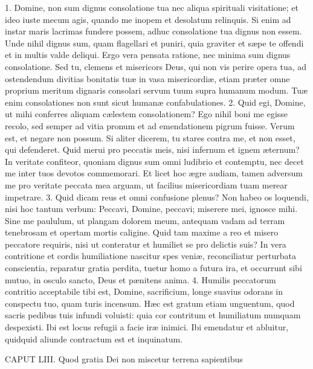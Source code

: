\documentclass[twoside]{article}
\begin{document}
1. Domine, non sum dignus consolatione tua nec aliqua spirituali visitatione; et ideo iuste mecum agis, quando me inopem et desolatum relinquis. Si enim ad instar maris lacrimas fundere possem, adhuc consolatione tua dignus non essem. Unde nihil dignus sum, quam flagellari et puniri, quia graviter et sæpe te offendi et in multis valde deliqui. Ergo vera pensata ratione, nec minima sum dignus consolatione. Sed tu, clemens et misericors Deus, qui non vis perire opera tua, ad ostendendum divitias bonitatis tuæ in vasa misericordiæ, etiam præter omne proprium meritum dignaris consolari servum tuum supra humanum modum. Tuæ enim consolationes non sunt sicut humanæ confabulationes.
2. Quid egi, Domine, ut mihi conferres aliquam cælestem consolationem? Ego nihil boni me egisse recolo, sed semper ad vitia pronum et ad emendationem pigrum fuisse. Verum est, et negare non possum. Si aliter dicerem, tu stares contra me, et non esset, qui defenderet. Quid merui pro peccatis meis, nisi infernum et ignem æternum? In veritate confiteor, quoniam dignus sum omni ludibrio et contemptu, nec decet me inter tuos devotos commemorari. Et licet hoc ægre audiam, tamen adversum me pro veritate peccata mea arguam, ut facilius misericordiam tuam merear impetrare.
3. Quid dicam reus et omni confusione plenus? Non habeo os loquendi, nisi hoc tantum verbum: Peccavi, Domine, peccavi; miserere mei, ignosce mihi. Sine me paululum, ut plangam dolorem meum, antequam vadam ad terram tenebrosam et opertam mortis caligine. Quid tam maxime a reo et misero peccatore requiris, nisi ut conteratur et humiliet se pro delictis suis? In vera contritione et cordis humiliatione nascitur spes veniæ, reconciliatur perturbata conscientia, reparatur gratia perdita, tuetur homo a futura ira, et occurrunt sibi mutuo, in osculo sancto, Deus et pænitens anima.
4. Humilis peccatorum contritio acceptabile tibi est, Domine, sacrificium, longe suavius odorans in conspectu tuo, quam turis incensum. Hæc est gratum etiam unguentum, quod sacris pedibus tuis infundi voluisti: quia cor contritum et humiliatum numquam despexisti. Ibi est locus refugii a facie iræ inimici. Ibi emendatur et abluitur, quidquid aliunde contractum est et inquinatum.


CAPUT LIII.
Quod gratia Dei non miscetur terrena sapientibus
\end{document}
